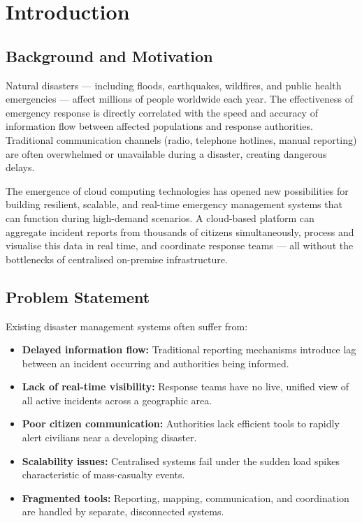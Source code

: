 \documentclass[12pt, a4paper]{report}
\begin{document}
\newpage

\tableofcontents
\newpage

\chapter{Introduction}

\section{Background and Motivation}

Natural disasters --- including floods, earthquakes, wildfires, and public health emergencies --- affect millions of people worldwide each year. The effectiveness of emergency response is directly correlated with the speed and accuracy of information flow between affected populations and response authorities. Traditional communication channels (radio, telephone hotlines, manual reporting) are often overwhelmed or unavailable during a disaster, creating dangerous delays.

The emergence of cloud computing technologies has opened new possibilities for building resilient, scalable, and real-time emergency management systems that can function during high-demand scenarios. A cloud-based platform can aggregate incident reports from thousands of citizens simultaneously, process and visualise this data in real time, and coordinate response teams --- all without the bottlenecks of centralised on-premise infrastructure.

\section{Problem Statement}

Existing disaster management systems often suffer from:

\begin{itemize}
  \item \textbf{Delayed information flow:} Traditional reporting mechanisms introduce lag between an incident occurring and authorities being informed.
  \item \textbf{Lack of real-time visibility:} Response teams have no live, unified view of all active incidents across a geographic area.
  \item \textbf{Poor citizen communication:} Authorities lack efficient tools to rapidly alert civilians near a developing disaster.
  \item \textbf{Scalability issues:} Centralised systems fail under the sudden load spikes characteristic of mass-casualty events.
  \item \textbf{Fragmented tools:} Reporting, mapping, communication, and coordination are handled by separate, disconnected systems.
\end{itemize}
\end{document}
